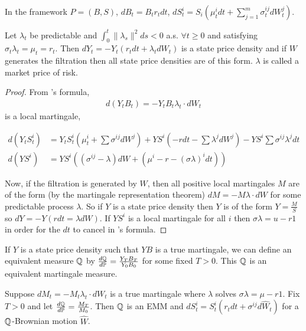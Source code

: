 
In the framework $P = (B, S)$, $dB_{t} = B_{t} r_{t} dt$, $dS^{i}_{t} =
S_{i}(\mu^{i}_{t} dt + \sum_{j=1}^{m} \sigma^{ij}_{t} dW^{j}_{t})$. 

\begin{thm}
  \label{defn:continuous_time:30}
  Let $\lambda_{t}$ be predictable and $\int_{0}^{t} \| \lambda_{s}
  \|^{2} ds < 0$ a.s. $\forall t \geq 0$ and satisfying $\sigma_{t}
  \lambda_{t} = \mu_{t} = r_{t}$.  Then $dY_{t} = -Y_{t}(r_{t} dt +
  \lambda_{t} dW_{t})$ is a state price density and if $W$ generates
  the filtration then all state price densities are of this form.
  $\lambda$ is called a market price of risk.
\end{thm}

\begin{proof}
  From \ito's formula,
  \begin{align}
    \label{eq:75}
    d(Y_{t} B_{t}) = -Y_{t} B_{t} \lambda_{t} \cdot dW_{t}
  \end{align} is a local martingale,

  \begin{align}
    \label{eq:155}
    d(Y_{t} S_{t}^{i}) &= Y_{t}S_{t}^{i}(\mu^{i}_{t} + \sum \sigma^{ij}
    dW^{j}) + YS^{i}(-r dt - \sum \lambda^{j} dW^{j}) - Y S^{i} \sum
    \sigma^{ij} \lambda^{j} dt \\
    d(YS^{i}) &= YS^{i}((\sigma^{ij} - \lambda) dW + (\mu^{i} - r -
    (\sigma \lambda)^{i} dt))
  \end{align}

  Now, if the filtration is generated by $W$, then all positive local
  martingales $M$ are of the form (by the martingale representation
  theorem) $dM = -M \lambda \cdot dW$ for some predictable process
  $\lambda$.  So if $Y$ is a state price density then $Y$ is of the
  form $Y = \frac{M}{S}$ so $dY = - Y(rdt = \lambda dW)$.  If $YS^{i}$
  is a local martingale for all $i$ then $\sigma \lambda = u - r1$ in
  order for the $dt$ to cancel in \ito's formula.
\end{proof}

If $Y$ is a state price density such that $YB$ is a true martingale,
we can define an equivalent measure $\Q$ by $\frac{d\Q}{d\Prob} =
\frac{Y_{T} B_{T}}{Y_{0} B_{0}}$ for some fixed $T > 0$.  This $\Q$ is
an equivalent martingale measure.

\begin{thm}
  \label{defn:continuous_time:31}
  Suppose $dM_{t} = -M_{t} \lambda_{t} \cdot dW_{t}$ is a true
  martingale where $\lambda$ solves $\sigma \lambda = \mu - r1$.  Fix
  $T > 0$ and let $\frac{d\Q}{d\Prob} = \frac{M_{T}}{M_{0}}$.  Then
  $\Q$ is an EMM and $dS_{t}^{i} = S_{t}^{i}(r_{t} dt + \sigma^{ij}
  d\hat W_{t})$ for a $\Q$-Brownian motion $\hat W$.
\end{thm}

